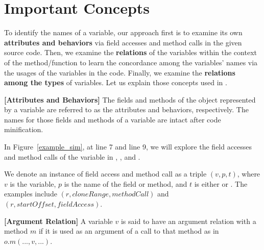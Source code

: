 \section{Important Concepts}
\label{sec:concepts}

To identify the names of a variable, our approach first is to examine
its own {\bf attributes and behaviors} via field accesses and method calls
in the given source code. Then, we examine the {\bf relations} of the
variables within the context of the method/function to learn the
concordance among the variables' names via the usages of the variables
in the code. Finally, we examine the {\bf relations among the types}
of variables. Let us explain those concepts used in {\tool}.

\begin{definition}{\bf [Attributes and Behaviors]}
  The fields and methods of the object represented by a variable are
  referred to as the attributes and behaviors, respectively. The names
  for those fields and methods of a variable are intact after code
  minification.
\end{definition}


In Figure~\ref{example_sim}, at line 7 and line 9, we will explore the
field accesses and method calls of the variable  in
, , and .

We denote an instance of field access and method call as a triple $(v,
p, t)$, where $v$ is the variable, $p$ is the name of the field or
method, and $t$ is either  or .
The examples include $(r, cloneRange, methodCall)$ and $(r,
startOffset, fieldAccess)$.



\begin{definition}{\bf [Argument Relation]}
  A variable $v$ is said to have an argument relation with a method
  $m$ if it is used as an argument of a call to that method as in
  $o.m(...,v,...)$.
\end{definition}

